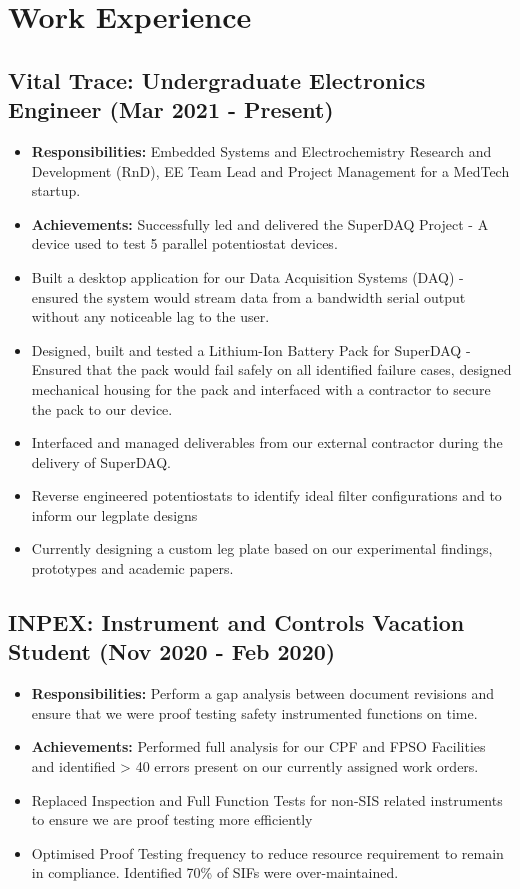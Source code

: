 \documentclass{article}[a4page]
\begin{document}
\section*{Work Experience}

\subsection*{Vital Trace: Undergraduate Electronics Engineer (Mar 2021 - Present)}
\begin{itemize}
    \item \textbf{Responsibilities: } Embedded Systems and Electrochemistry Research and Development (RnD), EE Team Lead and Project Management for a MedTech startup.
    \item \textbf{Achievements: } Successfully led and delivered the SuperDAQ Project - A device used to test 5 parallel potentiostat devices.
    \item Built a desktop application for our Data Acquisition Systems (DAQ) - ensured the system would stream data from a bandwidth serial output without any noticeable lag to the user.
    \item Designed, built and tested a Lithium-Ion Battery Pack for SuperDAQ - Ensured that the pack would fail safely on all identified failure cases, designed mechanical housing for the pack and interfaced with a contractor to secure the pack to our device.
    \item Interfaced and managed deliverables from our external contractor during the delivery of SuperDAQ.
    \item Reverse engineered potentiostats to identify ideal filter configurations and to inform our legplate designs
    \item Currently designing a custom leg plate based on our experimental findings, prototypes and academic papers. 
\end{itemize}

\subsection*{INPEX: Instrument and Controls Vacation Student \hfill (Nov 2020 - Feb 2020)}
\begin{itemize}
\item \textbf{Responsibilities:} Perform a gap analysis between document revisions and ensure that we were proof testing safety instrumented functions on time. 
\item \textbf{Achievements:} Performed full analysis for our CPF and FPSO Facilities and identified > 40 errors present on our currently assigned work orders.
\item Replaced Inspection and Full Function Tests for non-SIS related instruments to ensure we are proof testing more efficiently
\item Optimised Proof Testing frequency to reduce resource requirement to remain in compliance. Identified 70\% of SIFs were over-maintained.
\end{itemize}
\end{document}
